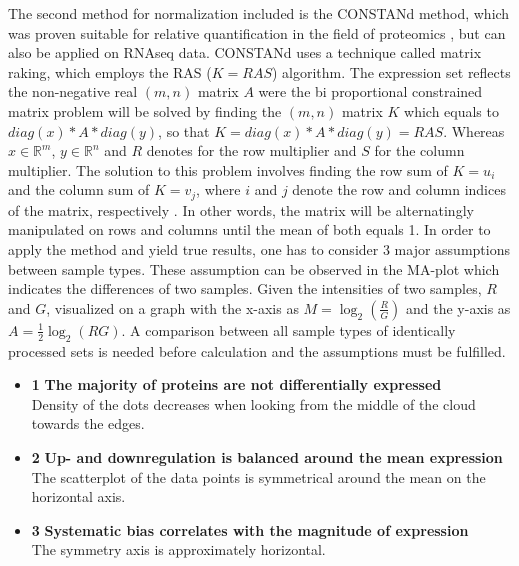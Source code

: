 \documentclass[
  11pt,
]{article}
\begin{document}
The second method for normalization included is the CONSTANd method, which was proven suitable for relative quantification in the field of proteomics \citep{Maes2016, VanHoutven2021}, but can also be applied on RNAseq data. CONSTANd uses a technique called matrix raking, which employs the RAS (\(K=RAS\)) algorithm. The expression set reflects the non-negative real \((m, n)\) matrix \(A\) were the bi proportional constrained matrix problem will be solved by finding the \((m, n)\) matrix \(K\) which equals to \(diag(x) * A *diag(y)\), so that \(K=diag(x) * A *diag(y)= RAS\). Whereas \(x \in \mathbb{R}^{m}\), \(y \in \mathbb{R}^{n}\) and \(R\) denotes for the row multiplier and \(S\) for the column multiplier. The solution to this problem involves finding the row sum of \(K=u_i\) and the column sum of \(K=v_j\), where \(i\) and \(j\) denote the row and column indices of the matrix, respectively \citep{Bacharach1965}. In other words, the matrix will be alternatingly manipulated on rows and columns until the mean of both equals 1. In order to apply the method and yield true results, one has to consider 3 major assumptions between sample types. These assumption can be observed in the MA-plot which indicates the differences of two samples. Given the intensities of two samples, \(R\) and \(G\), visualized on a graph with the x-axis as \(M=\log_2(\frac{R}{G})\) and the y-axis as \(A=\frac{1}{2}\log_2(RG)\). A comparison between all sample types of identically processed sets is needed before calculation and the assumptions must be fulfilled.

\begin{itemize}
\item{\textbf{1}} \textbf{The majority of proteins are not differentially expressed}
\\Density of the dots decreases when looking from the middle of the cloud towards the edges.

\item{\textbf{2}} \textbf{Up- and downregulation is balanced around the mean expression}
\\The scatterplot of the data points is symmetrical around the mean on the horizontal axis. 

\item{\textbf{3}} \textbf{Systematic bias correlates with the magnitude of expression}
\\The symmetry axis is approximately horizontal.

\end{itemize}
\end{document}

